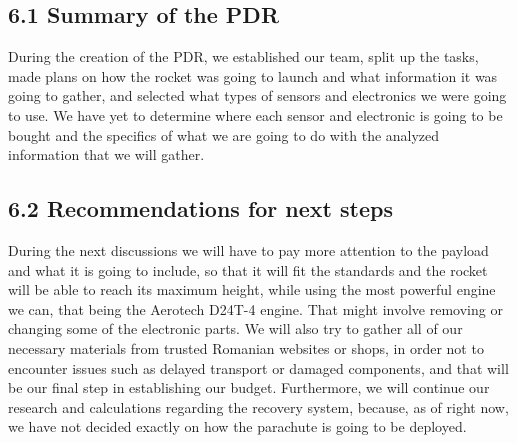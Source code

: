 \subsection*{6.1 Summary of the PDR}
During the creation of the PDR, we established our team, split up the tasks, made plans on how the rocket was going to launch and what information it was going to gather, and selected what types of sensors and electronics we were going to use. We have yet to determine where each sensor and electronic is going to be bought and the specifics of what we are going to do with the analyzed information that we will gather.

\subsection*{6.2 Recommendations for next steps}
During the next discussions we will have to pay more attention to the payload and what it is going to include, so that it will fit the standards and the rocket will be able to reach its maximum height, while using the most powerful engine we can, that being the Aerotech D24T-4 engine. That might involve removing or changing some of the electronic parts. We will also try to gather all of our necessary materials from trusted Romanian websites or shops, in order not to encounter issues such as delayed transport or damaged components, and that will be our final step in establishing our budget. Furthermore, we will continue our research and calculations regarding the recovery system, because, as of right now, we have not decided exactly on how the parachute is going to be deployed. 
